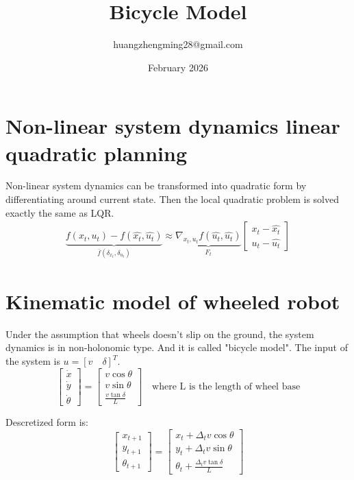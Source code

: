 \documentclass{article}
\title{Bicycle Model}
\author{huangzhengming28@gmail.com}
\date{February 2026}
\begin{document}
\section{Non-linear system dynamics linear quadratic planning}
Non-linear system dynamics can be transformed into quadratic form by differentiating around current state. Then the local quadratic problem is solved exactly the same as LQR.
\begin{gather}
    \underbrace{f(x_t, u_t) - f(\hat{x_t}, \hat{u_t})}_{\bar{f}(\delta_{x_t}, \delta_{u_t})} \approx \underbrace{\nabla_{x_t, u_t} f(\hat{u_t}, \hat{u_t})}_{F_t} \begin{bmatrix}
        x_t - \hat{x_t} \\ u_t - \hat{u_t}
    \end{bmatrix} \label{diff-dynamics}
\end{gather}

\section{Kinematic model of wheeled robot}
Under the assumption that wheels doesn't slip on the ground, the system dynamics is in non-holonomic type. And it is called "bicycle model". The input of the system is $u=[v \quad \delta]^T$.
\begin{equation}
    \begin{bmatrix}
        \dot x\\ \dot y\\ \dot \theta
    \end{bmatrix} = \begin{bmatrix}
        v\cos{\theta}\\
        v\sin{\theta}\\
        \frac{v\tan{\delta}}{L}
    \end{bmatrix} \quad \text{where L is the length of wheel base}
\end{equation}

Descretized form is:
\begin{equation}
    \begin{bmatrix}
        x_{t + 1}\\ y_{t + 1}\\ \theta_{t + 1}
    \end{bmatrix} = \begin{bmatrix}
        x_t + \Delta_t v\cos{\theta}\\
        y_t + \Delta_t v\sin{\theta}\\
        \theta_t + \frac{\Delta_t v\tan{\delta}}{L}
    \end{bmatrix} \label{descret-kinematic-dynamics}
\end{equation}
\end{document}

